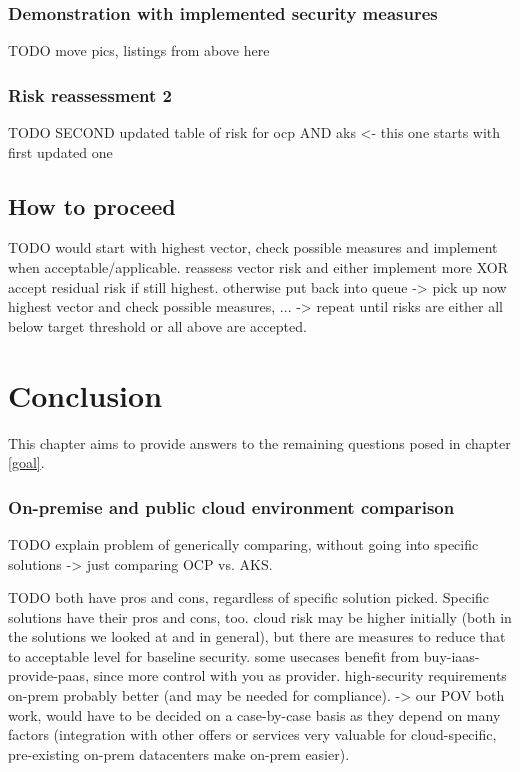 \subsection{Demonstration with implemented security measures}


TODO move pics, listings from above here

\subsection{Risk reassessment 2}

TODO SECOND updated table of risk for ocp AND aks <- this one starts with first updated one

\section{How to proceed}

TODO would start with highest vector, check possible measures and implement when acceptable/applicable. reassess vector risk and either implement more XOR accept residual risk if still highest. otherwise put back into queue -> pick up now highest vector and check possible measures, ... -> repeat until risks are either all below target threshold or all above are accepted.

\chapter{Conclusion}
This chapter aims to provide answers to the remaining questions posed in chapter \ref{goal}.

\subsection{On-premise and public cloud environment comparison}

TODO explain problem of generically comparing, without going into specific solutions -> just comparing OCP vs. AKS.

TODO both have pros and cons, regardless of specific solution picked.  Specific solutions have their pros and cons, too. cloud risk may be higher initially (both in the solutions we looked at and in general), but there are measures to reduce that to acceptable level for baseline security. some usecases benefit from buy-iaas-provide-paas, since more control with you as provider. high-security requirements on-prem probably better (and may be needed for compliance). -> our POV both work, would have to be decided on a case-by-case basis as they depend on many factors (integration with other offers or services very valuable for cloud-specific, pre-existing on-prem datacenters make on-prem easier).

